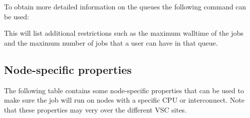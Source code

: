 To obtain more detailed information on the queues the following command can be
used:

\begin{prompt}
\end{prompt}

This will list additional restrictions such as the maximum walltime of the jobs
and the maximum number of jobs that a user can have in that queue.
\fi

\subsection{Node-specific properties}

The following table contains some node-specific properties that can be used to
make sure the job will run on nodes with a specific CPU or interconnect. Note
that these properties may very over the different VSC sites.

